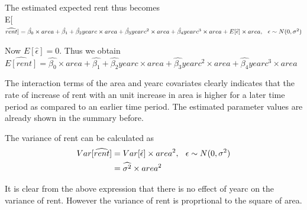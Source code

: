 \documentclass[12pt]{article}
\begin{document}
The estimated expected rent thus becomes\\
E[$\widehat{rent}] = \hat{\beta_0} \times area + \hat{\beta_1} + \hat{\beta_2} yearc \times area + \hat{\beta_3} yearc^2 \times area  + \hat{\beta_4} yearc^3 \times area + E[\widehat{\epsilon}] \times area, \hspace{0.1in} \epsilon \sim N(0,\sigma^2)$

Now $E[\hat{\epsilon}]=0$. Thus we obtain\\
$\widehat{E[rent]} = \hat{\beta_0} \times area + \hat{\beta_1} + \hat{\beta_2} yearc \times area + \hat{\beta_3} yearc^2 \times area  + \hat{\beta_4} yearc^3 \times area$

The interaction terms of the area and yearc covariates clearly indicates that the rate of increase of rent with an unit increase in area is higher for a later time period as compared to an earlier time period. The estimated parameter values are already shown in the summary before.

The variance of rent can be calculated as\\

\begin{equation*}
\begin{aligned}
Var[\widehat{rent}] &= Var[\hat{\epsilon}] \times area^2, \hspace{0.1in} \epsilon \sim N(0,\sigma^2)\\
&= \widehat{\sigma^2} \times area^2
\end{aligned}
\end{equation*}

It is clear from the above expression that there is no effect of yearc on the variance of rent. However the variance of rent is proprtional to the square of area.
\end{document}
